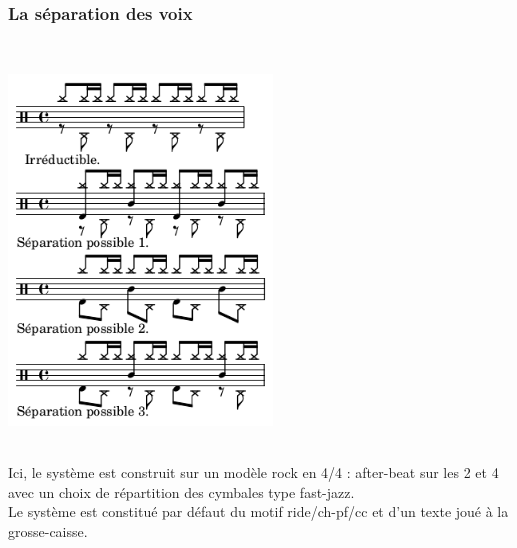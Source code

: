 \subsubsection{La séparation des voix}
\ \\
\includegraphics[height=100mm, width=70mm]{z_images/notation/description/separation_0.png}\\\\
Ici, le système est construit sur un modèle rock en 4/4 : after-beat sur les 2 et 4 avec un choix de répartition des cymbales type fast-jazz.\\
Le système est constitué par défaut du motif ride/ch-pf/cc et d’un texte joué à la grosse-caisse.


